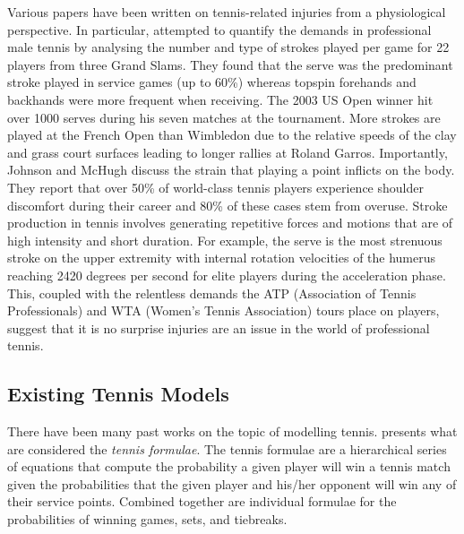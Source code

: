 \documentclass[authoryear, 12pt]{elsarticle}
\begin{document}
Various papers have been written on tennis-related injuries from a physiological perspective.  In particular, \cite{demands} attempted to quantify the demands in professional male tennis by analysing the number and type of strokes played per game for 22 players from three Grand Slams.  They found that the serve was the predominant stroke played in service games (up to 60\%) whereas topspin forehands and backhands were more frequent when receiving.  The 2003 US Open winner hit over 1000 serves during his seven matches at the tournament.  More strokes are played at the French Open than Wimbledon due to the relative speeds of the clay and grass court surfaces leading to longer rallies at Roland Garros.  Importantly, Johnson and McHugh discuss the strain that playing a point inflicts on the body.  They report that over 50\% of world-class tennis players experience shoulder discomfort during their career and 80\% of these cases stem from overuse.  Stroke production in tennis involves generating repetitive forces and motions that are of high intensity and short duration.  For example, the serve is the most strenuous stroke on the upper extremity with internal rotation velocities of the humerus reaching 2420 degrees per second for elite players during the acceleration phase.  This, coupled with the relentless demands the ATP (Association of Tennis Professionals) and WTA (Women's Tennis Association) tours place on players, suggest that it is no surprise injuries are an issue in the world of professional tennis.

\subsection{Existing Tennis Models}

There have been many past works on the topic of modelling tennis.  \cite{omalley} presents what are considered the \textit{tennis formulae}.  The tennis formulae are a hierarchical series of equations that compute the probability a given player will win a tennis match given the probabilities that the given player and his/her opponent will win any of their service points.  Combined together are individual formulae for the probabilities of winning games, sets, and tiebreaks.
\end{document}
